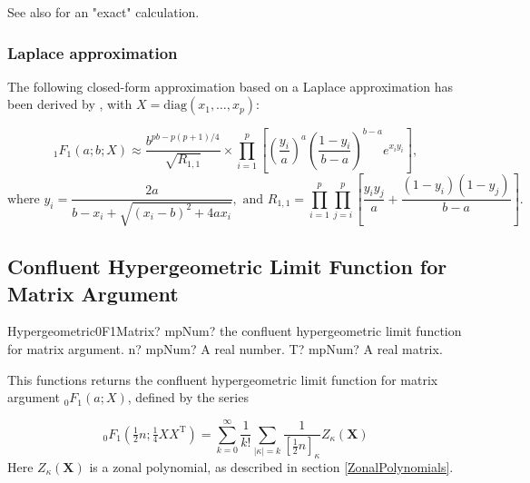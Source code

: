 See also \cite{Koev_2006} for an "exact" calculation.

\subsubsection{Laplace approximation}
The following closed-form approximation based on a Laplace approximation has been derived by \cite{Butler_Wood_2002}, with $X=\text{diag}(x_1,\ldots,x_p)$:

\begin{equation}
	{}_1{F}_1(a;b;X)  \approx \frac{b^{pb-p(p+1)/4}}{\sqrt{R_{1,1}}}  \times \prod_{i=1}^p \left[\left(\frac{y_i}{a}\right)^a \left(\frac{1-y_i}{b-a} \right)^{b-a} e^{x_i y_i}  \right],
\end{equation}
\begin{equation*}
	\text{where } y_i=\frac{2a}{b-x_i+\sqrt{(x_i-b)^2 + 4ax_i}}, \text{ and } R_{1,1} = \prod_{i=1}^p  \prod_{j=i}^p \left[\frac{y_i y_j}{a}+\frac{(1-y_i)(1-y_j)}{b-a}\right]. 
\end{equation*}












\newpage
\subsection{Confluent Hypergeometric Limit Function for Matrix Argument}
\label{Hypergeometric0F1Matrix}


\begin{mpFunctionsExtract}
	\mpFunctionTwoNotImplemented
	{Hypergeometric0F1Matrix? mpNum? the confluent hypergeometric limit function for matrix argument.}
	{n? mpNum? A real number.}
	{T? mpNum? A real matrix.}	
\end{mpFunctionsExtract}


\vspace{0.3cm}
This functions returns the confluent hypergeometric limit function for matrix argument ${}_0F_1(a; X)$, defined by the series \citep{NIST,Butler_Wood_2003}

\begin{equation}
	{}_0F_1(\tfrac{1}{2}n;\tfrac{1}{4}XX^{\text{T}}) = \sum_{k=0}^\infty \frac{1}{k!}  \sum_{|\kappa|=k}  \frac{1}{\left[\tfrac{1}{2}n\right]_{\kappa}} Z_{\kappa}(\textbf{X})
\end{equation}
Here $Z_{\kappa}(\textbf{X})$ is a zonal polynomial, as described in section \ref{ZonalPolynomials}.



